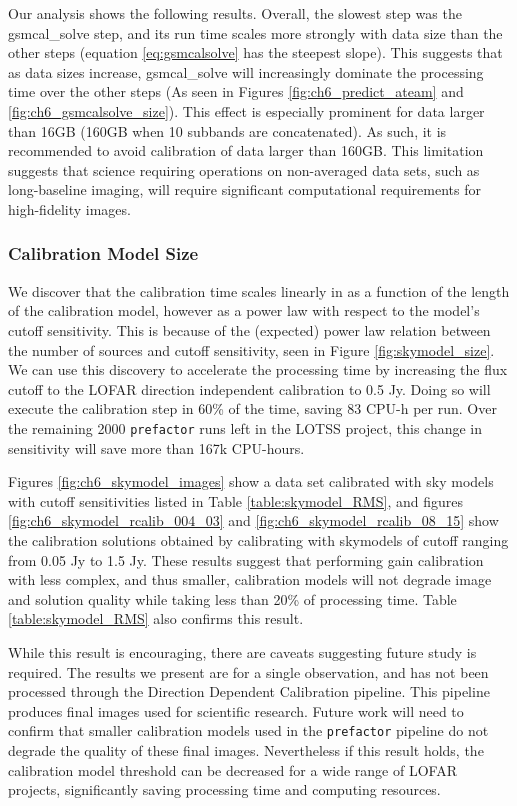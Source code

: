 Our analysis shows the following results. Overall, the slowest step was the {\selectfont gsmcal\_solve} step, and its run time scales more strongly with data size than the other steps (equation \ref{eq:gsmcalsolve} has the steepest slope). This suggests that as data sizes increase, {\selectfont gsmcal\_solve} will increasingly dominate the processing time over the other steps (As seen in Figures \ref{fig:ch6_predict_ateam} and \ref{fig:ch6_gsmcalsolve_size}). This effect is especially prominent for data larger than 16GB (160GB when 10 subbands are concatenated). As such, it is recommended to avoid calibration of data larger than 160GB. This limitation suggests that science requiring operations on non-averaged data sets, such as long-baseline imaging, will require significant computational requirements for high-fidelity images.

\subsubsection{Calibration Model Size}
We discover that the calibration time scales linearly in as a function of the length of the calibration model, however as a power law with respect to the model's cutoff sensitivity. This is because of the (expected) power law relation between the number of sources and cutoff sensitivity, seen in Figure \ref{fig:skymodel_size}. We can use this discovery to accelerate the processing time by increasing the flux cutoff to the LOFAR direction independent calibration to 0.5 Jy. Doing so will execute the calibration step in 60\% of the time, saving 83 CPU-h per run. Over the remaining 2000 \texttt{prefactor} runs left in the LOTSS project, this change in sensitivity will save more than 167k CPU-hours. 

Figures \ref{fig:ch6_skymodel_images} show a data set calibrated with sky models with cutoff sensitivities listed in Table \ref{table:skymodel_RMS}, and figures  \ref{fig:ch6_skymodel_rcalib_004_03} and \ref{fig:ch6_skymodel_rcalib_08_15} show the calibration solutions obtained by calibrating with skymodels of cutoff ranging from 0.05 Jy to 1.5 Jy. These results suggest that performing gain calibration with less complex, and thus smaller, calibration models will not degrade image and solution quality while taking less than 20\% of processing time. Table \ref{table:skymodel_RMS} also confirms this result. 

While this result is encouraging, there are caveats suggesting future study is required. The results we present are for a single observation, and has not been processed through the Direction Dependent Calibration pipeline. This pipeline produces final images used for scientific research. Future work will need to confirm that smaller calibration models used in the \texttt{prefactor} pipeline do not degrade the quality of these final images. Nevertheless if this result holds, the calibration model threshold can be decreased for a wide range of LOFAR projects, significantly saving processing time and computing resources. 

